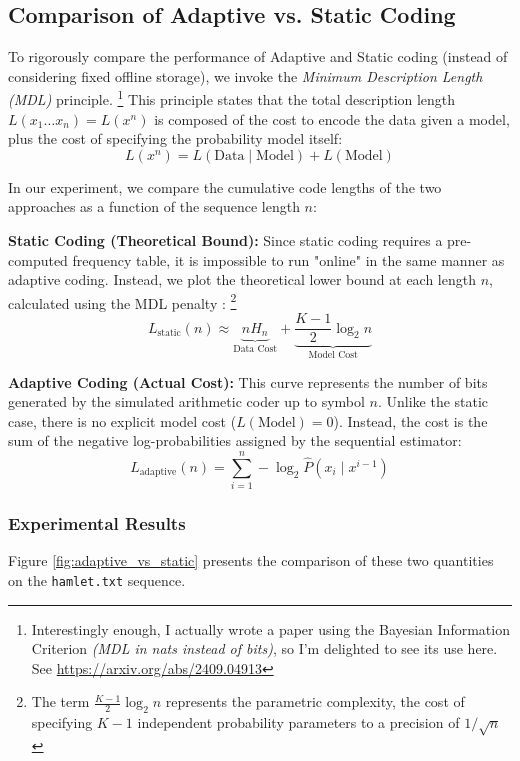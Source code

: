 \documentclass[11pt,a4paper]{article}
\theoremstyle{definition} %
\begin{document}
\subsection{Comparison of Adaptive vs. Static Coding}

To rigorously compare the performance of Adaptive and Static coding (instead of considering fixed offline storage), we invoke the \textit{Minimum Description Length (MDL)} principle. \footnote{Interestingly enough, I actually wrote a paper using the Bayesian Information Criterion \textit{(MDL in nats instead of bits)}, so I'm delighted to see its use here. See \url{https://arxiv.org/abs/2409.04913}} This principle states that the total description length $L(x_1 \dots x_n)=L(x^n)$ is composed of the cost to encode the data given a model, plus the cost of specifying the probability model itself: \cite[Chap 14]{cover}
\begin{equation}
    L(x^n) = L(\text{Data} \mid \text{Model}) + L(\text{Model})
\end{equation}

In our experiment, we compare the cumulative code lengths of the two approaches as a function of the sequence length $n$:

\textbf{Static Coding (Theoretical Bound):}
Since static coding requires a pre-computed frequency table, it is impossible to run "online" in the same manner as adaptive coding. Instead, we plot the theoretical lower bound at each length $n$, calculated using the MDL penalty \cite[Ch. 28]{mackay}: \footnote{The term $\frac{K-1}{2} \log_2 n$ represents the parametric complexity, the cost of specifying $K-1$ independent probability parameters to a precision of $1/\sqrt{n}$}
\begin{equation}
    L_{\text{static}}(n) \approx \underbrace{n H_n}_{\text{Data Cost}} + \underbrace{\frac{K-1}{2} \log_2 n}_{\text{Model Cost}}
\end{equation}

\textbf{Adaptive Coding (Actual Cost):}
This curve represents the number of bits generated by the simulated arithmetic coder up to symbol $n$. Unlike the static case, there is no explicit model cost ($L(\text{Model}) = 0$). Instead, the cost is the sum of the negative log-probabilities assigned by the sequential estimator:
\begin{equation}
    L_{\text{adaptive}}(n) = \sum_{i=1}^n -\log_2 \hat{P}(x_i \mid x^{i-1})
\end{equation}

\subsubsection{Experimental Results}
Figure \ref{fig:adaptive_vs_static} presents the comparison of these two quantities on the \texttt{hamlet.txt} sequence.
\end{document}
